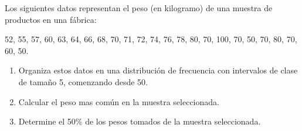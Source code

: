 \begin{exercise}
    Los siguientes datos representan el peso (en kilogramo) de una muestra de productos en una fábrica:
    
    52, 55, 57, 60, 63, 64, 66, 68, 70, 71, 72, 74, 76, 78, 80, 70, 100, 70, 50, 70, 80, 70, 60, 50.
    \begin{enumerate}
        \item Organiza estos datos en una distribución de frecuencia con intervalos de clase de tamaño 5, comenzando desde 50.
        \item Calcular el peso mas común en la muestra seleccionada.
        \item Determine el 50\% de los pesos tomados de la muestra seleccionada.
    \end{enumerate}
\end{exercise}
